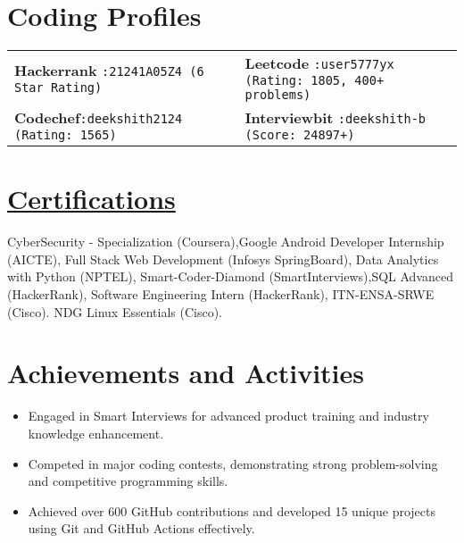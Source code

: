 \documentclass[a4paper,10pt]{article}
\begin{document}
\section{Coding Profiles}

\begin{flushleft}
\begin{tabular}{l l}
    \textbf{Hackerrank} \texttt{:21241A05Z4 (6 Star Rating)} & \textbf{Leetcode} \hspace{17pt}\texttt{:user5777yx (Rating: 1805, 400+ problems)} \\
    \textbf{Codechef}\hspace{14pt}\texttt{:deekshith2124 (Rating: 1565)} & \textbf{Interviewbit} \texttt{:deekshith-b\textunderscore 240 (Score: 24897+)} \\
\end{tabular}
\end{flushleft}
\vspace{-1pt}


\section{ \href{https://certificates7878.glitch.me/}{Certifications}}


\textrm{
\hspace{-3pt}CyberSecurity - Specialization (Coursera),Google Android Developer Internship (AICTE), Full Stack Web Development (Infosys SpringBoard), Data Analytics with Python (NPTEL), Smart-Coder-Diamond (SmartInterviews),SQL Advanced (HackerRank), Software Engineering Intern (HackerRank), ITN-ENSA-SRWE (Cisco). NDG Linux Essentials (Cisco).
}




\section{Achievements and Activities}

\vspace{5pt}
\begin{itemize}

    \item Engaged in Smart Interviews for advanced product training and industry knowledge enhancement.\vspace{-5pt}
    \item Competed in major coding contests, demonstrating strong problem-solving and competitive programming skills.\vspace{-5pt}
    \item Achieved over 600 GitHub contributions and developed 15 unique projects using Git and GitHub Actions effectively.\vspace{-5pt}
    
\end{itemize}
\end{document}
